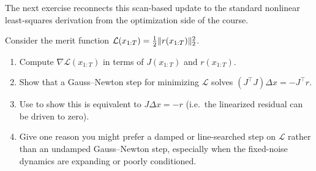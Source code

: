 \documentclass[11pt]{article}
\newif\ifshowsolutions
\newcommand{\SolutionBox}[2][10]{%
  \ifshowsolutions
    \begin{tcolorbox}[stat221panelgray,title={Solution}]
    #2
    \end{tcolorbox}
  \else
    \begin{tcolorbox}[stat221panelgray,unbreakable,title={Workspace}]
    \vspace{#1\baselineskip}
    \end{tcolorbox}
  \fi
}
\begin{document}
The next exercise reconnects this scan-based update to the standard nonlinear least-squares derivation from the optimization side of the course.
\begin{exercise}
\label{ex:gauss-newton-viewpoint}
Consider the merit function $\mathcal{L}(x_{1:T})=\tfrac12 \lVert r(x_{1:T})\rVert_2^2$.
\begin{enumerate}[leftmargin=*]
  \item Compute $\nabla \mathcal{L}(x_{1:T})$ in terms of $J(x_{1:T})$ and $r(x_{1:T})$.
  \item Show that a Gauss--Newton step for minimizing $\mathcal{L}$ solves $(J^\top J)\Delta x = -J^\top r$.
  \item Use  to show this is equivalent to $J\Delta x=-r$ (i.e.\ the linearized residual can be driven to zero).
  \item Give one reason you might prefer a damped or line-searched step on $\mathcal{L}$ rather than an undamped Gauss--Newton step, especially when the fixed-noise dynamics are expanding or poorly conditioned.
\end{enumerate}
\end{exercise}
\SolutionBox[18]{%
\begin{enumerate}[leftmargin=*]
  \item Let $r=r(x_{1:T})$ and $J=J(x_{1:T})$.
  Using the chain rule for $\mathcal{L}(x)=\tfrac12 \ip{r(x),r(x)}$ gives
  \[
    \nabla \mathcal{L}(x_{1:T}) = J(x_{1:T})^\top r(x_{1:T}).
  \]
  \item A Gauss--Newton step minimizes the linearized least-squares model
  \[
    \min_{\Delta x}\ \tfrac12\norm{r(x_{1:T})+J(x_{1:T})\,\Delta x}_2^2.
  \]
  Differentiating with respect to $\Delta x$ gives the normal equations
  \[
    J(x_{1:T})^\top\!\bigl(r(x_{1:T})+J(x_{1:T})\,\Delta x\bigr)=0,
  \]
  i.e.\ $(J^\top J)\Delta x=-J^\top r$.
  \item By \Cref{cor:newton-solve-well-defined}, $J$ is invertible, hence so is $J^\top$.
  Left-multiplying $(J^\top J)\Delta x=-J^\top r$ by $J^{-\top}$ yields $J\Delta x=-r$.
  Equivalently, the linearized residual $r+J\Delta x$ can be made exactly zero in one Gauss--Newton step.
  \item Undamped Gauss--Newton steps can diverge far from a solution (the linear model for $r$ may be inaccurate).
  Minimizing $\mathcal{L}$ with damping/backtracking is often more robust because it enforces descent in $\mathcal{L}$, providing a safeguard when the local linearization is poor.%
\end{enumerate}
}
\end{document}
